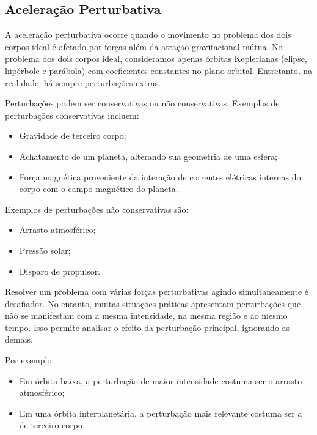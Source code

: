 \subsection{Aceleração Perturbativa}
\par A aceleração perturbativa ocorre quando o movimento no problema dos dois corpos ideal é afetado por forças além da atração gravitacional mútua. No problema dos dois corpos ideal, consideramos apenas órbitas Keplerianas (elipse, hipérbole e parábola) com coeficientes constantes no plano orbital. Entretanto, na realidade, há sempre perturbações extras.

\par Perturbações podem ser conservativas ou não conservativas. Exemplos de perturbações conservativas incluem:

\begin{itemize}
  \item Gravidade de terceiro corpo;
  \item Achatamento de um planeta, alterando sua geometria de uma esfera;
  \item Força magnética proveniente da interação de correntes elétricas internas do corpo com o campo magnético do planeta.
\end{itemize}

\par Exemplos de perturbações não conservativas são:

\begin{itemize}
  \item Arrasto atmosférico;
  \item Pressão solar;
  \item Disparo de propulsor.
\end{itemize}

\par Resolver um problema com várias forças perturbativas agindo simultaneamente é desafiador. No entanto, muitas situações práticas apresentam perturbações que não se manifestam com a mesma intensidade, na mesma região e ao mesmo tempo. Isso permite analisar o efeito da perturbação principal, ignorando as demais.

\par Por exemplo:

\begin{itemize}
  \item Em órbita baixa, a perturbação de maior intensidade costuma ser o arrasto atmosférico;
  \item Em uma órbita interplanetária, a perturbação mais relevante costuma ser a de terceiro corpo.
\end{itemize}

